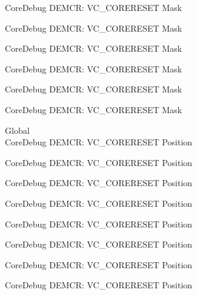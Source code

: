 \begin{DoxyRefList}
\label{deprecated__deprecated000892}%
%
Core\+Debug DEMCR\+: VC\+\_\+\+CORERESET Mask 

\label{deprecated__deprecated000955}%
%
Core\+Debug DEMCR\+: VC\+\_\+\+CORERESET Mask 

\label{deprecated__deprecated001034}%
%
Core\+Debug DEMCR\+: VC\+\_\+\+CORERESET Mask 

\label{deprecated__deprecated001110}%
%
Core\+Debug DEMCR\+: VC\+\_\+\+CORERESET Mask 

\label{deprecated__deprecated001199}%
%
Core\+Debug DEMCR\+: VC\+\_\+\+CORERESET Mask 

\label{deprecated__deprecated001301}%
%
Core\+Debug DEMCR\+: VC\+\_\+\+CORERESET Mask  
\item[Global \doxylink{group___c_m_s_i_s___core_debug_ga9fcf09666f7063a7303117aa32a85d5a}{Core\+Debug\+\_\+\+DEMCR\+\_\+\+VC\+\_\+\+CORERESET\+\_\+\+Pos} ]\hfill \\
\label{deprecated__deprecated000069}%
%
Core\+Debug DEMCR\+: VC\+\_\+\+CORERESET Position 

\label{deprecated__deprecated000137}%
%
Core\+Debug DEMCR\+: VC\+\_\+\+CORERESET Position 

\label{deprecated__deprecated000213}%
%
Core\+Debug DEMCR\+: VC\+\_\+\+CORERESET Position 

\label{deprecated__deprecated000276}%
%
Core\+Debug DEMCR\+: VC\+\_\+\+CORERESET Position 

\label{deprecated__deprecated000355}%
%
Core\+Debug DEMCR\+: VC\+\_\+\+CORERESET Position 

\label{deprecated__deprecated000431}%
%
Core\+Debug DEMCR\+: VC\+\_\+\+CORERESET Position 

\label{deprecated__deprecated000520}%
%
Core\+Debug DEMCR\+: VC\+\_\+\+CORERESET Position 

\label{deprecated__deprecated000622}%
%
Core\+Debug DEMCR\+: VC\+\_\+\+CORERESET Position 


\end{DoxyRefList}
